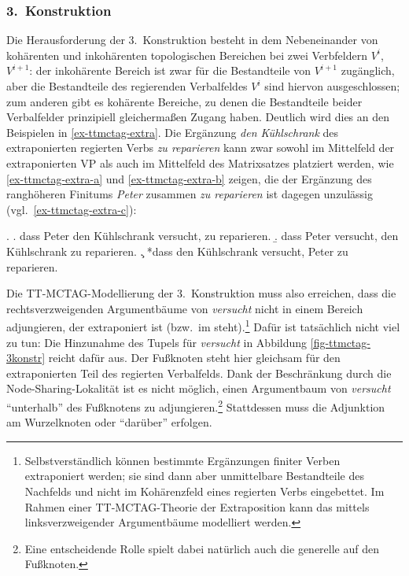 

\subsubsection*{3.~Konstruktion}

Die Herausforderung der 3.~Konstruktion besteht in dem Nebeneinander von kohärenten und inkohärenten topologischen Bereichen bei zwei Verbfeldern $V^i$, $V^{i+1}$: der inkohärente Bereich ist zwar für die Bestandteile von $V^{i+1}$ zugänglich, aber die Bestandteile des regierenden Verbalfeldes $V^i$ sind hiervon ausgeschlossen; zum anderen gibt es kohärente Bereiche, zu denen die Bestandteile beider Verbalfelder prinzipiell gleicherma\ss en Zugang haben. Deutlich wird dies an den Beispielen in \ref{ex-ttmctag-extra}. Die Ergänzung {\it den Kühlschrank} des extraponierten regierten Verbs {\it zu reparieren} kann zwar sowohl im Mittelfeld der extraponierten VP als auch im Mittelfeld des Matrixsatzes platziert werden, wie \ref{ex-ttmctag-extra-a} und \ref{ex-ttmctag-extra-b} zeigen, die  der Ergänzung des ranghöheren Finitums {\it Peter} zusammen \textit{zu reparieren} ist dagegen unzulässig (vgl.\ \ref{ex-ttmctag-extra-c}): 

\ex. \label{ex-ttmctag-extra}
\a. dass Peter den Kühlschrank versucht, zu reparieren. \label{ex-ttmctag-extra-a}
\b. dass Peter versucht, den Kühlschrank zu reparieren. \label{ex-ttmctag-extra-b}
\c. *dass den Kühlschrank versucht, Peter zu reparieren. \label{ex-ttmctag-extra-c}

Die TT-MCTAG-Modellierung der 3.~Konstruktion muss also erreichen, dass die rechtsverzweigenden Argumentbäume von {\it versucht} nicht in einem Bereich adjungieren, der extraponiert ist (bzw.\ im  steht).\footnote{Selbstverständlich können bestimmte Ergänzungen finiter Verben extraponiert werden; sie sind dann aber unmittelbare Bestandteile des Nachfelds und nicht im Kohärenzfeld eines regierten Verbs eingebettet. Im Rahmen einer TT-MCTAG-Theorie der Extraposition kann das mittels linksverzweigender Argumentbäume modelliert werden.} Dafür ist tatsächlich nicht viel zu tun: Die Hinzunahme des Tupels für {\it versucht} in Abbildung \ref{fig-ttmctag-3konstr} reicht dafür aus. Der Fu\ss knoten steht hier gleichsam für den extraponierten Teil des regierten Verbalfelds. Dank der Beschränkung durch die Node-Sharing-Lokalität ist es nicht möglich, einen Argumentbaum von {\it versucht} "`unterhalb"' des Fu\ss knotens zu adjungieren.\footnote{Eine entscheidende Rolle spielt dabei natürlich auch die generelle  auf den Fu\ss knoten.} Stattdessen muss die Adjunktion am Wurzelknoten oder "`darüber"' erfolgen. 


